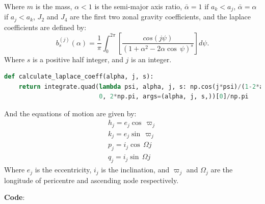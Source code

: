 \documentclass[11pt, oneside]{article}   	%
\begin{document}
Where $m$ is the mass, $\alpha < 1$ is the semi-major axis ratio, $\bar{\alpha} = 1 \text{ if } a_{k} < a_{j}$, $\bar{\alpha} = \alpha$ if $a_{j}<a_{k}$, $J_{2}$ and $J_{4}$ are the first two zonal gravity coefficients, and the laplace coefficients are defined by:
\begin{equation}
b^{(j)}_{s} (\alpha) = \frac{1}{\pi}\int_{0}^{2\pi}\left [ \frac{cos(j \psi)}{(1+\alpha^{2} - 2\alpha \cos\, \psi)^{s}} \right]d\psi.
\end{equation}
Where $s$ is a positive half integer, and $j$ is an integer. 
\begin{lstlisting}[language=Python, caption={Calculating the laplace coefficient}]
def calculate_laplace_coeff(alpha, j, s):
    return integrate.quad(lambda psi, alpha, j, s: np.cos(j*psi)/(1-2*alpha*np.cos(psi)+alpha**2)**s,
                          0, 2*np.pi, args=(alpha, j, s,))[0]/np.pi
\end{lstlisting}

And the equations of motion are given by:
\begin{subequations}
\begin{gather}
\label{eq:h}
   h_{j} = e_{j}\cos\, \varpi_{j}\\
\label{eq:k}
   k_{j} = e_{j}\sin\, \varpi_{j}\\
\label{eq:p}
   p_{j} = i_{j}\cos\, \Omega{j}\\
\label{eq:q}
   q_{j} = i_{j}\sin\, \Omega{j}
\end{gather}
\end{subequations}
Where $e_{j}$ is the eccentricity, $i_{j}$ is the inclination, and $\varpi_{j}$ and $\Omega_{j}$ are the longitude of pericentre and ascending node respectively. 

\textbf{Code}:
\end{document}
